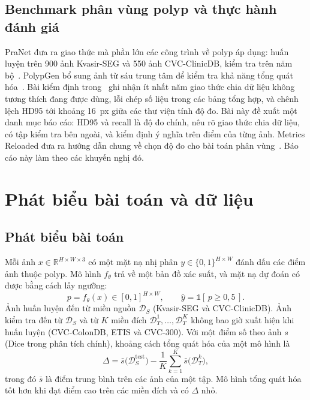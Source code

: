 \documentclass[10pt,twoside]{article}
\begin{document}
\subsection{Benchmark phân vùng polyp và thực hành đánh giá}
PraNet đưa ra giao thức mà phần lớn các công trình về polyp áp dụng: huấn luyện trên
900 ảnh Kvasir-SEG và 550 ảnh CVC-ClinicDB, kiểm tra trên năm
bộ~\cite{fan2020pranet}. PolypGen bổ sung ảnh từ sáu trung tâm để kiểm tra khả năng
tổng quát hóa~\cite{ali2023polypgen}. Bài kiểm định trong~\cite{urooj2026audit} ghi
nhận ít nhất năm giao thức chia dữ liệu không tương thích đang được dùng, lỗi chép số
liệu trong các bảng tổng hợp, và chênh lệch HD95 tới khoảng 16~px giữa các thư viện
tính độ đo. Bài này đề xuất một danh mục báo cáo: HD95 và recall là độ đo chính, nêu
rõ giao thức chia dữ liệu, có tập kiểm tra bên ngoài, và kiểm định ý nghĩa trên điểm
của từng ảnh. Metrics Reloaded đưa ra hướng dẫn chung về chọn độ đo cho bài toán
phân vùng~\cite{maierhein2024metrics}. Báo cáo này làm theo các khuyến nghị đó.

\section{Phát biểu bài toán và dữ liệu}\label{sec:problem}
\subsection{Phát biểu bài toán}
Mỗi ảnh $x\in\mathbb{R}^{H\times W\times 3}$ có một mặt nạ nhị phân
$y\in\{0,1\}^{H\times W}$ đánh dấu các điểm ảnh thuộc polyp. Mô hình $f_\theta$ trả
về một bản đồ xác suất, và mặt nạ dự đoán có được bằng cách lấy ngưỡng:
\begin{equation}
  p = f_\theta(x)\in[0,1]^{H\times W},\qquad \hat{y} = \mathbb{1}[\,p \ge 0{,}5\,].
\end{equation}
Ảnh huấn luyện đến từ miền nguồn $\mathcal{D}_S$ (Kvasir-SEG và CVC-ClinicDB). Ảnh
kiểm tra đến từ $\mathcal{D}_S$ và từ $K$ miền đích
$\mathcal{D}_T^1,\dots,\mathcal{D}_T^K$ không bao giờ xuất hiện khi huấn luyện
(CVC-ColonDB, ETIS và CVC-300). Với một điểm số theo ảnh $s$ (Dice trong phân tích
chính), khoảng cách tổng quát hóa của một mô hình là
\begin{equation}\label{eq:gap}
  \Delta = \bar{s}\bigl(\mathcal{D}_S^{\text{test}}\bigr)
  - \frac{1}{K}\sum_{k=1}^{K}\bar{s}\bigl(\mathcal{D}_T^{k}\bigr),
\end{equation}
trong đó $\bar{s}$ là điểm trung bình trên các ảnh của một tập. Mô hình tổng quát hóa
tốt hơn khi đạt điểm cao trên các miền đích và có $\Delta$ nhỏ.
\end{document}
